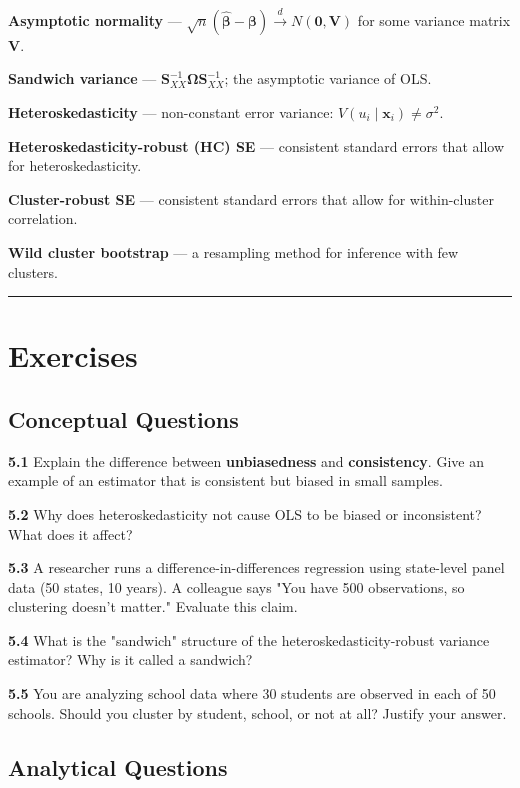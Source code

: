 \textbf{Asymptotic normality} --- $\sqrt{n}(\hat{\boldsymbol{\beta}} - \boldsymbol{\beta}) \xrightarrow{d} N(\mathbf{0}, \mathbf{V})$ for some variance matrix $\mathbf{V}$.

\textbf{Sandwich variance} --- $\mathbf{S}_{XX}^{-1}\boldsymbol{\Omega}\mathbf{S}_{XX}^{-1}$; the asymptotic variance of OLS.

\textbf{Heteroskedasticity} --- non-constant error variance: $V(u_i \mid \mathbf{x}_i) \neq \sigma^2$.

\textbf{Heteroskedasticity-robust (HC) SE} --- consistent standard errors that allow for heteroskedasticity.

\textbf{Cluster-robust SE} --- consistent standard errors that allow for within-cluster correlation.

\textbf{Wild cluster bootstrap} --- a resampling method for inference with few clusters.

\medskip\hrule\medskip

\section{Exercises}

\subsection{Conceptual Questions}

\textbf{5.1} Explain the difference between \textbf{unbiasedness} and \textbf{consistency}. Give an example of an estimator that is consistent but biased in small samples.

\textbf{5.2} Why does heteroskedasticity not cause OLS to be biased or inconsistent? What does it affect?

\textbf{5.3} A researcher runs a difference-in-differences regression using state-level panel data (50 states, 10 years). A colleague says "You have 500 observations, so clustering doesn't matter." Evaluate this claim.

\textbf{5.4} What is the "sandwich" structure of the heteroskedasticity-robust variance estimator? Why is it called a sandwich?

\textbf{5.5} You are analyzing school data where 30 students are observed in each of 50 schools. Should you cluster by student, school, or not at all? Justify your answer.

\subsection{Analytical Questions}

